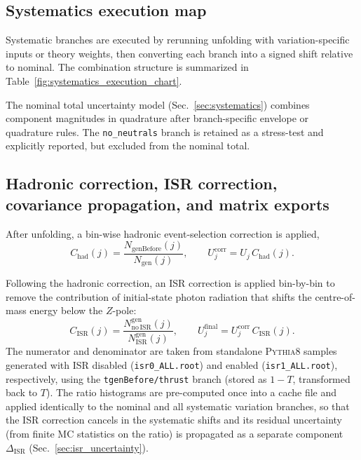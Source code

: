 \subsection{Systematics execution map}

Systematic branches are executed by rerunning unfolding with variation-specific inputs or theory weights, then converting each branch into a signed shift relative to nominal.
The combination structure is summarized in Table~\ref{fig:systematics_execution_chart}.



The nominal total uncertainty model (Sec.~\ref{sec:systematics}) combines component magnitudes in quadrature after branch-specific envelope or quadrature rules.
The \texttt{no\_neutrals} branch is retained as a stress-test and explicitly reported, but excluded from the nominal total.

\subsection{Hadronic correction, ISR correction, covariance propagation, and matrix exports}
\label{sec:corrections_and_cov}

After unfolding, a bin-wise hadronic event-selection correction is applied,
\begin{equation}
C_{\mathrm{had}}(j)=\frac{N_{\mathrm{genBefore}}(j)}{N_{\mathrm{gen}}(j)},
\qquad
U_j^{\mathrm{corr}} = U_j\,C_{\mathrm{had}}(j).
\end{equation}

Following the hadronic correction, an ISR correction is applied bin-by-bin to remove the contribution of initial-state photon radiation that shifts the centre-of-mass energy below the $Z$-pole:
\begin{equation}
C_{\mathrm{ISR}}(j)=\frac{N^{\mathrm{gen}}_{\mathrm{no\,ISR}}(j)}{N^{\mathrm{gen}}_{\mathrm{ISR}}(j)},
\qquad
U_j^{\mathrm{final}} = U_j^{\mathrm{corr}}\,C_{\mathrm{ISR}}(j).
\end{equation}
The numerator and denominator are taken from standalone \textsc{Pythia8} samples generated with ISR disabled (\texttt{isr0\_ALL.root}) and enabled (\texttt{isr1\_ALL.root}), respectively, using the \texttt{tgenBefore/thrust} branch (stored as $1-T$, transformed back to $T$). The ratio histograms are pre-computed once into a cache file and applied identically to the nominal and all systematic variation branches, so that the ISR correction cancels in the systematic shifts and its residual uncertainty (from finite MC statistics on the ratio) is propagated as a separate component $\Delta_{\mathrm{ISR}}$ (Sec.~\ref{sec:isr_uncertainty}).

